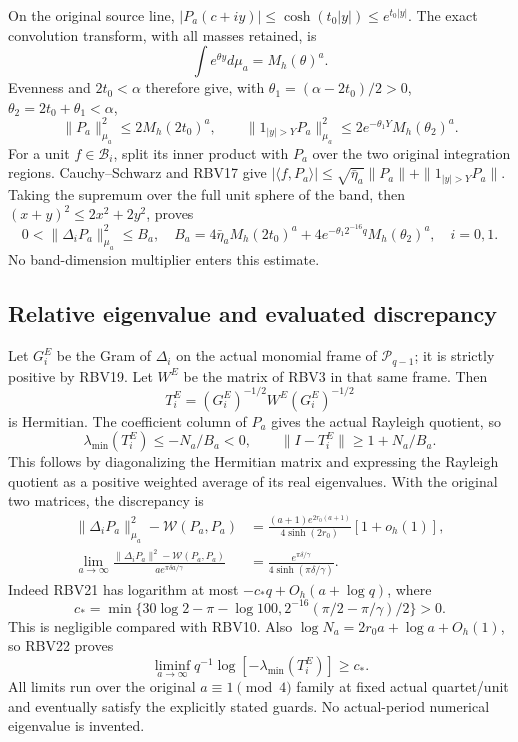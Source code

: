 On the original source line,
$|P_a(c+iy)|\le\cosh(t_0|y|)\le e^{t_0|y|}$.
The exact convolution transform, with all masses retained, is
\[
\int e^{\theta y}d\mu_a=M_h(\theta)^a.
\]
Evenness and $2t_0<\alpha$ therefore give, with
$\theta_1=(\alpha-2t_0)/2>0$, $\theta_2=2t_0+\theta_1<\alpha$,
\[
\|P_a\|_{\mu_a}^2\le2M_h(2t_0)^a,\qquad
\|1_{|y|>Y}P_a\|_{\mu_a}^2
 \le2e^{-\theta_1Y}M_h(\theta_2)^a.
\tag{RBV20}
\]
For a unit $f\in\mathcal B_i$, split its inner product with $P_a$
over the two original integration regions. Cauchy--Schwarz and RBV17
give
$|\langle f,P_a\rangle|\le\sqrt{\bar\eta_a}\|P_a\|+
\|1_{|y|>Y}P_a\|$. Taking the supremum over the full unit sphere
of the band, then $(x+y)^2\le2x^2+2y^2$, proves
\[
\boxed{0<\|\Delta_iP_a\|_{\mu_a}^2\le B_a,
\quad B_a=4\bar\eta_aM_h(2t_0)^a+
4e^{-\theta_1 2^{-16}q}M_h(\theta_2)^a,\quad i=0,1.}
\tag{RBV21}
\]
No band-dimension multiplier enters this estimate.

\subsection{Relative eigenvalue and evaluated discrepancy}
Let $G_i^E$ be the Gram of $\Delta_i$ on the actual monomial frame
of $\mathcal P_{q-1}$; it is strictly positive by RBV19.
Let $W^E$ be the matrix of RBV3 in that same frame. Then
\[
T_i^E=(G_i^E)^{-1/2}W^E(G_i^E)^{-1/2}
\]
is Hermitian. The coefficient column of $P_a$ gives the actual
Rayleigh quotient, so
\[
\lambda_{\min}(T_i^E)\le-N_a/B_a<0,\qquad
\|I-T_i^E\|\ge1+N_a/B_a.\tag{RBV22}
\]
This follows by diagonalizing the Hermitian matrix and expressing
the Rayleigh quotient as a positive weighted average of its real
eigenvalues. With the original two matrices, the discrepancy is
\[
\begin{split}
\|\Delta_iP_a\|_{\mu_a}^2-\mathcal W(P_a,P_a)
&=\frac{(a+1)e^{2r_0(a+1)}}{4\sinh(2r_0)}[1+o_h(1)],\\
\lim_{a\to\infty}\frac{\|\Delta_iP_a\|^2-\mathcal W(P_a,P_a)}
 {a e^{\pi\delta a/\gamma}}
&=\frac{e^{\pi\delta/\gamma}}{4\sinh(\pi\delta/\gamma)}.
\end{split}\tag{RBV23}
\]
Indeed RBV21 has logarithm at most
$-c_*q+O_h(a+\log q)$, where
\[
c_*=\min\{30\log2-\pi-\log100,
                   2^{-16}(\pi/2-\pi/\gamma)/2\}>0.
\tag{RBV24}
\]
This is negligible compared with RBV10. Also
$\log N_a=2r_0a+\log a+O_h(1)$, so RBV22 proves
\[
\liminf_{a\to\infty}q^{-1}\log[-\lambda_{\min}(T_i^E)]\ge c_*.
\tag{RBV25}
\]
All limits run over the original $a\equiv1\pmod4$ family at fixed
actual quartet/unit and eventually satisfy the explicitly stated
guards. No actual-period numerical eigenvalue is invented.

